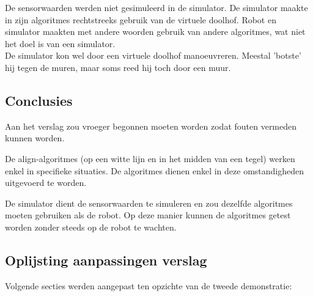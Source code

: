 \documentclass[tt3]{penoverslag}
\begin{document}
De sensorwaarden werden niet gesimuleerd in de simulator. De simulator maakte in zijn algoritmes rechtstreeks gebruik van de virtuele doolhof. Robot en simulator maakten met andere woorden gebruik van andere algoritmes, wat niet het doel is van een simulator.\\

De simulator kon wel door een virtuele doolhof manoeuvreren. Meestal 'botste' hij tegen de muren, maar soms reed hij toch door een muur.


\subsection{Conclusies} %
\label{Assec:conc2}
Aan het verslag zou vroeger begonnen moeten worden zodat fouten vermeden kunnen worden.

De align-algoritmes (op een witte lijn en in het midden van een tegel) werken enkel in specifieke situaties. De algoritmes dienen enkel in deze omstandigheden uitgevoerd te worden.

De simulator dient de sensorwaarden te simuleren en zou dezelfde algoritmes moeten gebruiken als de robot. Op deze manier kunnen de algoritmes getest worden zonder steeds op de robot te wachten.


\subsection{Oplijsting aanpassingen verslag} %
\label{Assec:aanp2}
Volgende secties werden aangepast ten opzichte van de tweede demonstratie:
\end{document}
